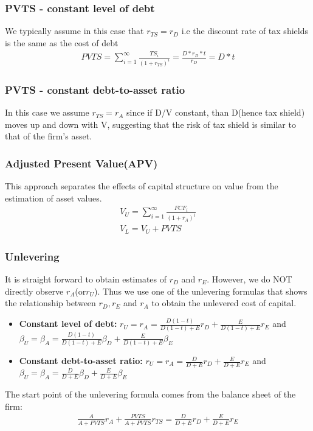 \documentclass{article}
\theoremstyle{definition}
\theoremstyle{thrm}
\theoremstyle{lma}
\theoremstyle{ppst}
\theoremstyle{crlr}
\begin{document}
\subsubsection{PVTS - constant level of debt}
We typically assume in this case that $r_{TS} = r_D$ i.e the discount rate of tax shields is the same as the cost of debt
\begin{align*}
	PVTS = \sum_{i=1}^\infty \frac{TS_i}{(1+r_{TS})^i} = \frac{D*r_D*t}{r_D} = D*t
\end{align*}

\subsubsection{PVTS - constant debt-to-asset ratio}
In this case we assume $r_{TS} = r_A$ since if D/V constant, than D(hence tax shield) moves up and down with V, suggesting that the risk of tax shield is similar to that of the firm's asset.

\subsubsection{Adjusted Present Value(APV)}
This approach separates the effects of capital structure on value from the estimation of asset values. 
\begin{align*}
	V_U = \sum_{i=1}^\infty \frac{FCF_i}{(1+r_A)^i}\\
	V_L = V_U+PVTS
\end{align*}

\subsubsection{Unlevering}
It is straight forward to obtain estimates of $r_D$ and $r_E$. However, we do NOT directly observe $r_A$(or$r_U$). Thus we use one of the unlevering formulas that shows the relationship between $r_D, r_E$  and $r_A$ to obtain the unlevered cost of capital. 
\begin{itemize}
	\item \textbf{Constant level of debt:} $r_U = r_A = \frac{D(1-t)}{D(1-t)+E}r_D+\frac{E}{D(1-t)+E}r_E$ and $\beta_U = \beta_A = \frac{D(1-t)}{D(1-t)+E}\beta_D+\frac{E}{D(1-t)+E}\beta_E$
	\item \textbf{Constant debt-to-asset ratio: } $r_U = r_A = \frac{D}{D+E}r_D+\frac{E}{D+E}r_E$ and $\beta_U = \beta_A = \frac{D}{D+E}\beta_D+\frac{E}{D+E}\beta_E$
\end{itemize}
The start point of the unlevering formula comes from the balance sheet of the firm:
\begin{align*}
	\frac{A}{A+PVTS}r_A + \frac{PVTS}{A+PVTS}r_{TS} = \frac{D}{D+E}r_D+\frac{E}{D+E}r_E
\end{align*}
\end{document}

